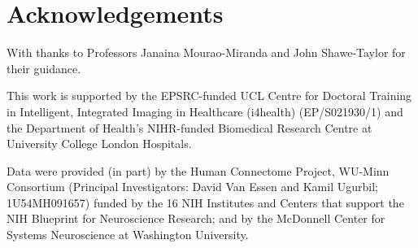 \chapter*{Acknowledgements}

With thanks to Professors Janaina Mourao-Miranda and John Shawe-Taylor for their guidance.

This work is supported by the EPSRC-funded UCL Centre for Doctoral Training in Intelligent, Integrated Imaging in Healthcare (i4health) (EP/S021930/1) and the Department of Health’s NIHR-funded Biomedical Research Centre at University College London Hospitals.

Data were provided (in part) by the Human Connectome Project, WU-Minn Consortium (Principal Investigators: David Van Essen and Kamil Ugurbil; 1U54MH091657) funded by the 16 NIH Institutes and Centers that support the NIH Blueprint for Neuroscience Research; and by the McDonnell Center for Systems Neuroscience at Washington University.
